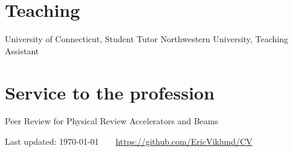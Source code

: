 \documentclass[11pt]{article} %
\begin{document}



\section*{Teaching}

 University of Connecticut, Student Tutor
 Northwestern University, Teaching Assistant


\section*{Service to the profession}

Peer Review for Physical Review Accelerators and Beams

\vfill %


\begin{center}
	\scriptsize
	Last updated: \today~~\raisebox{-0.5pt}{\textbullet}~~\href{https://github.com/EricViklund/CV}{https://github.com/EricViklund/CV}
\end{center}

\end{document}
